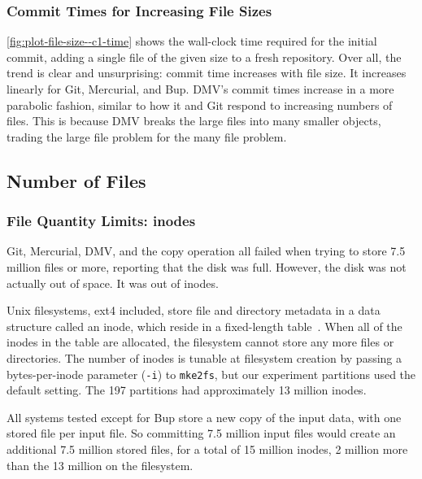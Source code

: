 %

\subsubsection{Commit Times for Increasing File Sizes}

\autoref{fig:plot-file-size--c1-time} shows the wall-clock time required for the initial \gls{commit}, adding a single file of the given size to a fresh \gls{repository}.
Over all, the trend is clear and unsurprising: \gls{commit} time increases with file size.
It increases linearly for Git, Mercurial, and Bup.
DMV's commit times increase in a more parabolic fashion,
similar to how it and Git respond to increasing numbers of files.
This is because DMV breaks the large files into many smaller objects, trading the large file problem for the many file problem.


%



\subsection{Number of Files}

\subsubsection{File Quantity Limits: inodes}

Git, Mercurial, DMV, and the copy operation all failed when trying to store \num{7.5} million files or more, reporting that the disk was full.
However, the disk was not actually out of space.
It was out of \glspl{inode}.

Unix filesystems, ext4 included, store file and directory metadata in a data structure called an \gls{inode}, which reside in a fixed-length table~\cite{unix_timesharing_system}.
When all of the \glspl{inode} in the table are allocated, the filesystem cannot store any more files or directories.
The number of inodes is tunable at filesystem creation by passing a bytes-per-inode parameter (\lstinline{-i}) to \lstinline{mke2fs}, but our experiment partitions used the default setting.
The \SI{197}{\gib} partitions had approximately \num{13} million inodes.

All systems tested except for Bup store a new copy of the input data, with one stored file per input file.
So committing \num{7.5} million input files would create an additional \num{7.5} million stored files, for a total of \num{15} million inodes, \num{2} million more than the \num{13} million on the filesystem.

